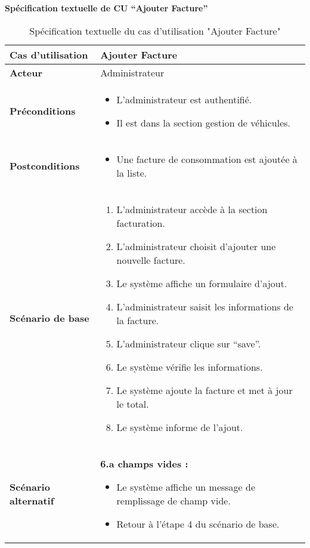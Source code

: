 \documentclass[a4paper,11pt]{report}
\begin{document}
\newpage
\textbf{Spécification textuelle de CU “Ajouter Facture”}
\begin{table}[H]
  \centering
  \renewcommand{\arraystretch}{1.5}
  \caption{Spécification textuelle du cas d'utilisation "Ajouter Facture"}
  \begin{tabularx}{\textwidth}{|l|X|}
    \hline
    \textbf{Cas d'utilisation} & Ajouter Facture \\ \hline
    \textbf{Acteur}            & Administrateur \\ \hline
    \textbf{Préconditions}     & 
      \begin{itemize}
        \item L’administrateur est authentifié.
        \item Il est dans la section gestion de véhicules.
      \end{itemize} \\ \hline
    \textbf{Postconditions}    & 
      \begin{itemize}
        \item Une facture de consommation est ajoutée à la liste.
      \end{itemize} \\ \hline
    \textbf{Scénario de base}  & 
      \begin{enumerate}
        \item L’administrateur accède à la section facturation.
        \item L'administrateur choisit d’ajouter une nouvelle facture.
        \item Le système affiche un formulaire d’ajout.
        \item L’administrateur saisit les informations de la facture.
        \item L'administrateur clique sur “save”.
        \item Le système vérifie les informations.
        \item Le système ajoute la facture et met à jour le total.
        \item Le système informe de l’ajout.
      \end{enumerate} \\ \hline
    \textbf{Scénario alternatif} & 
      \textbf{6.a champs vides :}
      \begin{itemize}
        \item Le système affiche un message de remplissage de champ vide.
        \item Retour à l’étape 4 du scénario de base.
      \end{itemize} \\ \hline
  \end{tabularx}
\end{table}
\end{document}
